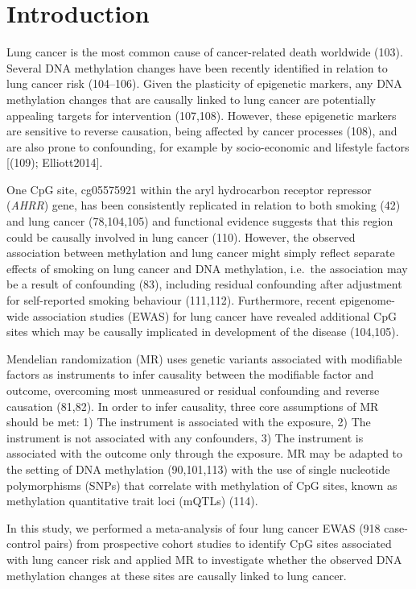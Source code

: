 \documentclass[11pt,twoside]{bristolthesis}
\begin{document}
\hypertarget{introduction-2}{%
\section{Introduction}\label{introduction-2}}

Lung cancer is the most common cause of cancer-related death worldwide (103). Several DNA methylation changes have been recently identified in relation to lung cancer risk (104--106). Given the plasticity of epigenetic markers, any DNA methylation changes that are causally linked to lung cancer are potentially appealing targets for intervention (107,108). However, these epigenetic markers are sensitive to reverse causation, being affected by cancer processes (108), and are also prone to confounding, for example by socio-economic and lifestyle factors {[}(109); Elliott2014{]}.

One CpG site, cg05575921 within the aryl hydrocarbon receptor repressor (\emph{AHRR}) gene, has been consistently replicated in relation to both smoking (42) and lung cancer (78,104,105) and functional evidence suggests that this region could be causally involved in lung cancer (110). However, the observed association between methylation and lung cancer might simply reflect separate effects of smoking on lung cancer and DNA methylation, i.e.~the association may be a result of confounding (83), including residual confounding after adjustment for self-reported smoking behaviour (111,112). Furthermore, recent epigenome-wide association studies (EWAS) for lung cancer have revealed additional CpG sites which may be causally implicated in development of the disease (104,105).

Mendelian randomization (MR) uses genetic variants associated with modifiable factors as instruments to infer causality between the modifiable factor and outcome, overcoming most unmeasured or residual confounding and reverse causation (81,82). In order to infer causality, three core assumptions of MR should be met: 1) The instrument is associated with the exposure, 2) The instrument is not associated with any confounders, 3) The instrument is associated with the outcome only through the exposure. MR may be adapted to the setting of DNA methylation (90,101,113) with the use of single nucleotide polymorphisms (SNPs) that correlate with methylation of CpG sites, known as methylation quantitative trait loci (mQTLs) (114).

In this study, we performed a meta-analysis of four lung cancer EWAS (918 case-control pairs) from prospective cohort studies to identify CpG sites associated with lung cancer risk and applied MR to investigate whether the observed DNA methylation changes at these sites are causally linked to lung cancer.
\end{document}
